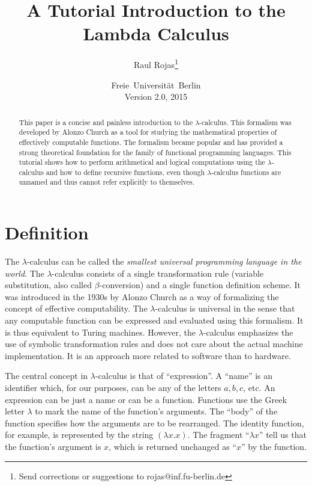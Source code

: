 \documentclass[12pt]{article}
\title{A Tutorial Introduction to the Lambda Calculus}
\author{ Raul  Rojas\thanks{Send corrections or suggestions to rojas@inf.fu-berlin.de}}
\date{\mbox{Freie Universit\"at Berlin}\\
Version 2.0, 2015}
\begin{document}
\maketitle

\begin{abstract}
This paper is a concise and painless introduction to the $\lambda$-calculus. This formalism  
 was developed by Alonzo Church as a tool for studying the mathematical properties of effectively computable functions. The formalism 
became popular and has provided  a strong theoretical foundation  for the family of functional programming languages. 
This tutorial shows how to perform arithmetical and logical computations using the  $\lambda$-calculus and how to define recursive functions, 
even though  $\lambda$-calculus functions are unnamed and thus cannot refer explicitly to themselves. 
\end{abstract}

\section{Definition}

The $\lambda$-calculus can be called the {\it smallest universal programming language in the world\/}. The $\lambda$-calculus consists of a single transformation rule (variable substitution, also called $\beta$-conversion) and a single function definition scheme. It was introduced in the 1930s by Alonzo Church as a way of formalizing the concept of effective computability. The $\lambda$-calculus is universal in the sense that any computable function can be expressed and evaluated using this formalism. It is thus equivalent to Turing machines. However, the $\lambda$-calculus emphasizes the use of symbolic transformation rules and does not care about the actual machine implementation. It is an approach more related to software than to hardware. 

The central concept in $\lambda$-calculus is that of ``expression''. 
A ``name'' is an identifier which, for our purposes, can be any of the letters $a,b,c$, etc. 
An expression can be just a name or can be a function. Functions use the Greek letter $\lambda$ to mark the
name of the function's arguments. The ``body'' of the function specifies how the arguments are to be rearranged. The identity function, for example, is represented by the string  $(\lambda x.x)$. The fragment ``$\lambda x$'' tell us that the function's argument is $x$, which is returned unchanged as ``$x$'' by the function.
\end{document}
